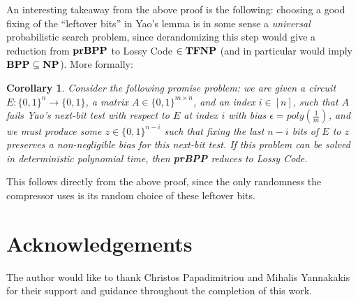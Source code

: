 \documentclass[11pt]{article}
\newtheorem{corollary}{Corollary}
\newcommand{\B}{\{0,1\}}
\def\cl{\bf}
\begin{document}
An interesting takeaway from the above proof is the following: choosing a good fixing of the ``leftover bits'' in Yao's lemma is in some sense a \emph{universal} probabilistic search problem, since derandomizing this step would give a reduction from ${\cl prBPP}$ to {\sc Lossy Code} $\in {\cl TFNP}$ (and in particular would imply ${\cl BPP} \subseteq {\cl NP}$). More formally:
\begin{corollary}\label{cor:yao}
Consider the following promise problem: we are given a circuit $E\colon \B^n \to \B$, a matrix $A \in \B^{m \times n}$, and an index $i \in [n]$, such that $A$ fails Yao's next-bit test with respect to $E$ at index $i$ with bias $\epsilon = poly(\frac{1}{m})$, and we must produce some $z\in \B^{n-i}$ such that fixing the last $n-i$ bits of $E$ to $z$ preserves a non-negligible bias for this next-bit test. If this problem can be solved in deterministic polynomial time, then {\cl prBPP} reduces to {\sc Lossy Code}.
\end{corollary}
This follows directly from the above proof, since the only randomness the compressor uses is its random choice of these leftover bits. 
\section{Acknowledgements}
The author would like to thank Christos Papadimitriou and Mihalis Yannakakis for their support and guidance throughout the completion of this work.


\appendix
\end{document}
